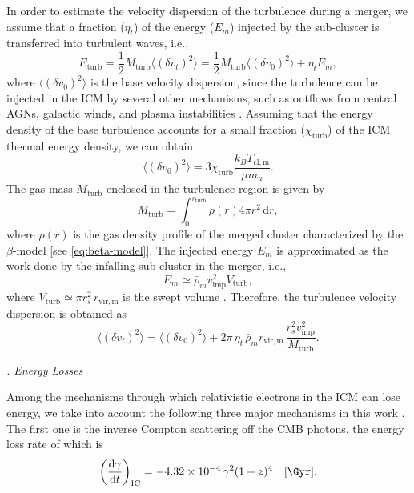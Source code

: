 \documentclass[twocolumn]{aastex62}
\newcommand{\R}[1]{\mathrm{#1}}
\newcommand{\D}[1]{\R{d} #1}
\newcommand{\diff}[2]{\frac{\D{#1}}{\D{#2}}}
\newcounter{sssseccount}
\newcommand{\sssseclabel}{\alph{sssseccount}}
\newcommand{\ssssec}[1]{%
  \vspace{1ex}%
  \stepcounter{sssseccount}%
  \noindent\emph{\sssseclabel. #1}%
}
\begin{document}
{In order to estimate the velocity dispersion of the turbulence during a
merger, we assume that a fraction ($\eta_t$) of the energy ($E_m$) injected
by the sub-cluster is transferred into turbulent waves, i.e.,
\begin{equation}
  \label{eq:energy-turb}
  E_{\R{turb}} =
    \frac{1}{2} M_{\R{turb}} \langle (\delta v_t)^2 \rangle =
    \frac{1}{2} M_{\R{turb}} \langle (\delta v_0)^2 \rangle + \eta_t E_m ,
\end{equation}
where
$\langle (\delta v_0)^2 \rangle$ is the base velocity dispersion, since
the turbulence can be injected in the ICM by several other mechanisms, such
as outflows from central AGNs, galactic winds, and plasma instabilities
\citep{iapichino2011,vazza2011}.
Assuming that the energy density of the base turbulence accounts for a
small fraction ($\chi_{\R{turb}}$) of the ICM thermal energy density, we
can obtain
\begin{equation}
  \label{eq:v-turb-init}
  \langle (\delta v_0)^2 \rangle
    = 3 \chi_{\R{turb}} \frac{k_B T_{\R{cl,m}}}{\mu m_u} .
\end{equation}
The gas mass $M_{\R{turb}}$ enclosed in the turbulence region is given by
\begin{equation}
  \label{eq:mass-turb}
  M_{\R{turb}} = \int_0^{r_{\R{turb}}} \! \rho(r) 4\pi r^2 \,\D{r},
\end{equation}
where $\rho(r)$ is the gas density profile of the merged cluster
characterized by the $\beta$-model [see \autoref{eq:beta-model}].
The injected energy $E_m$ is approximated as the work done by the infalling
sub-cluster in the merger, i.e.,
\begin{equation}
  \label{eq:energy-inj}
  E_m \simeq \bar{\rho}_m v_{\R{imp}}^2 V_{\R{turb}},
\end{equation}
where $V_{\R{turb}} \simeq \pi r_s^2 \,r_{\R{vir,m}}$ is the swept volume
\citep{fujita2003,cassano2005}.
Therefore, the turbulence velocity dispersion is obtained as
\begin{equation}
  \label{eq:v-turb}
  \langle (\delta v_t)^2 \rangle
    = \langle (\delta v_0)^2 \rangle
    + 2 \pi\,\eta_t\, \bar{\rho}_m r_{\R{vir,m}}
      \,\frac{r_s^2 v_{\R{imp}}^2}{M_{\R{turb}}} .
\end{equation}
} %

\ssssec{Energy Losses}

Among the mechanisms through which relativistic electrons
in the ICM can lose energy, we take into account the following three
major mechanisms in this work \citep{sarazin1999}.
The first one is the inverse Compton scattering off the CMB photons,
the energy loss rate of which is
\begin{equation}
  \label{eq:eloss-ic}
  \left( \diff{\gamma}{t} \right)_{\R{IC}} =
    \num{-4.32e-4} \,\gamma^2 (1+z)^4
    \quad [\si{\per\Gyr}].
\end{equation}
\end{document}
